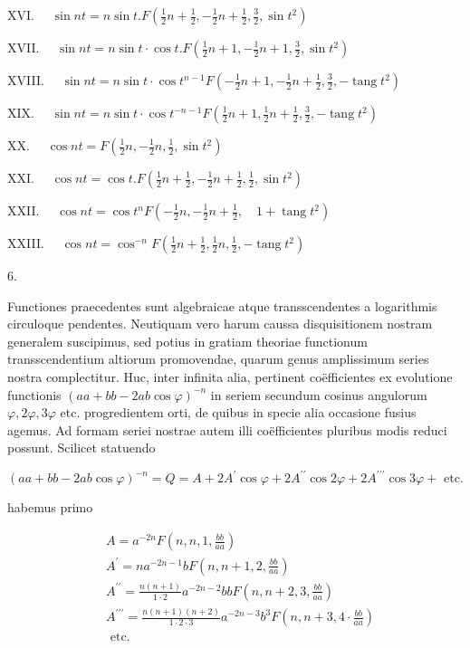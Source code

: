 \documentclass[10pt]{article}
\begin{document}
XVI. \(\quad \sin n t=n \sin t . F\left(\frac{1}{2} n+\frac{1}{2},-\frac{1}{2} n+\frac{1}{2}, \frac{3}{2}, \sin t^{2}\right)\)

XVII. \(\quad \sin n t=n \sin t \cdot \cos t . F\left(\frac{1}{2} n+1,-\frac{1}{2} n+1, \frac{3}{2}, \sin t^{2}\right)\)

XVIII. \(\quad \sin n t=n \sin t \cdot \cos t^{n-1} F\left(-\frac{1}{2} n+1,-\frac{1}{2} n+\frac{1}{2}, \frac{3}{2},-\operatorname{tang} t^{2}\right)\)

XIX. \(\quad \sin n t=n \sin t \cdot \cos t^{-n-1} F\left(\frac{1}{2} n+1, \frac{1}{2} n+\frac{1}{2}, \frac{3}{2},-\operatorname{tang} t^{2}\right)\)

XX. \(\quad \cos n t=F\left(\frac{1}{2} n,-\frac{1}{2} n, \frac{1}{2}, \sin t^{2}\right)\)

XXI. \(\quad \cos n t=\cos t . F\left(\frac{1}{2} n+\frac{1}{2},-\frac{1}{2} n+\frac{1}{2}, \frac{1}{2}, \sin t^{2}\right)\)

XXII. \(\quad \cos n t=\cos t^{n} F\left(-\frac{1}{2} n,-\frac{1}{2} n+\frac{1}{2}, \quad 1+\operatorname{tang} t^{2}\right)\)

XXIII. \(\quad \cos n t=\cos ^{-n} F\left(\frac{1}{2} n+\frac{1}{2}, \frac{1}{2} n, \frac{1}{2},-\operatorname{tang} t^{2}\right)\)

6.

Functiones praecedentes sunt algebraicae atque transscendentes a logarithmis circuloque pendentes. Neutiquam vero harum caussa disquisitionem nostram generalem suscipimus, sed potius in gratiam theoriae functionum transscendentium altiorum promovendae, quarum genus amplissimum series nostra complectitur. Huc, inter infinita alia, pertinent coëfficientes ex evolutione functionis \((a a+b b-2 a b \cos \varphi)^{-n}\) in seriem secundum cosinus angulorum \(\varphi, 2 \varphi, 3 \varphi\) etc. progredientem orti, de quibus in specie alia occasione fusius agemus. Ad formam seriei nostrae autem illi coëfficientes pluribus modis reduci possunt. Scilicet statuendo

\[
(a a+b b-2 a b \cos \varphi)^{-n}=Q=A+2 A^{\prime} \cos \varphi+2 A^{\prime \prime} \cos 2 \varphi+2 A^{\prime \prime \prime} \cos 3 \varphi+\text { etc. }
\]

habemus primo

\[
\begin{aligned}
& A=a^{-2 n} F\left(n, n, 1, \frac{b b}{a a}\right) \\
& A^{\prime}=n a^{-2 n-1} b F\left(n, n+1,2, \frac{b b}{a a}\right) \\
& A^{\prime \prime}=\frac{n(n+1)}{1 \cdot 2} a^{-2 n-2} b b F\left(n, n+2,3, \frac{b b}{a a}\right) \\
& A^{\prime \prime \prime}=\frac{n(n+1)(n+2)}{1 \cdot 2 \cdot 3} a^{-2 n-3} b^{3} F\left(n, n+3,4 \cdot \frac{b b}{a a}\right) \\
& \text { etc. }
\end{aligned}
\]
\end{document}

